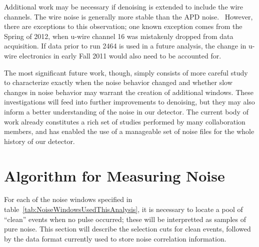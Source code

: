Additional work may be necessary if denoising is extended to include the wire channels.  The wire noise is generally more stable than the APD noise.~\cite{JosiahCoherentAPDNoise}  However, there are exceptions to this observation; one known exception comes from the Spring of 2012, when u-wire channel 16 was mistakenly dropped from data acquisition.  If data prior to run 2464 is used in a future analysis, the change in u-wire electronics in early Fall 2011 would also need to be accounted for.

The most significant future work, though, simply consists of more careful study to characterize exactly when the noise behavior changed and whether slow changes in noise behavior may warrant the creation of additional windows.  These investigations will feed into further improvements to denoising, but they may also inform a better understanding of the noise in our detector.  The current body of work already constitutes a rich set of studies performed by many collaboration members, and has enabled the use of a manageable set of noise files for the whole history of our detector.

\section{Algorithm for Measuring Noise}\label{sec:NoiseCorrelationsImplementation}

For each of the noise windows specified in table~\ref{tab:NoiseWindowsUsedThisAnalysis}, it is necessary to locate a pool of ``clean'' events when no pulse occurred; these will be interpretted as samples of pure noise.  This section will describe the selection cuts for clean events, followed by the data format currently used to store noise correlation information.

